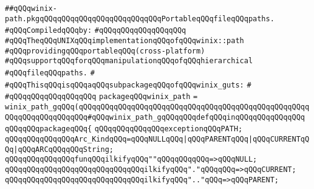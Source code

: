 \label{src/lib/std/src/posix/winix-path.pkg}
\verb|##qQQqwinix-path.pkgqQQqqQQqqQQqqQQqqQQqqQQqqQQqPortableqQQqfileqQQqpaths.|\newline
\newline
\verb|#qQQqCompiledqQQqby:|\newline
\verb|#qQQqqQQqqQQqqQQqqQQq|\newline
\newline
\verb|#qQQqTheqQQqUNIXqQQqimplementationqQQqofqQQqwinix::path|\newline
\verb|#qQQqprovidingqQQqportableqQQq(cross-platform)|\newline
\verb|#qQQqsupportqQQqforqQQqmanipulationqQQqofqQQqhierarchical|\newline
\verb|#qQQqfileqQQqpaths.|\newline
\verb|#|\newline
\verb|#qQQqThisqQQqisqQQqaqQQqsubpackageqQQqofqQQqwinix_guts:|\newline
\verb|#|\newline
\verb|#qQQqqQQqqQQqqQQqqQQq|\newline
\newline
\newline
\verb|packageqQQqwinix_path|\newline
\verb|=|\newline
\verb|winix_path_gqQQq(qQQqqQQqqQQqqQQqqQQqqQQqqQQqqQQqqQQqqQQqqQQqqQQqqQQqqQQqqQQqqQQqqQQqqQQq#qQQqwinix_path_gqQQqqQQqdefqQQqinqQQqqQQqqQQqqQQq|\newline
\verb|qQQqqQQqpackageqQQq{|\newline
\newline
\verb|qQQqqQQqqQQqqQQqexceptionqQQqPATH;|\newline
\newline
\verb|qQQqqQQqqQQqqQQqArc_KindqQQq=qQQqNULLqQQq|\verb#|qQQqPARENTqQQq|qQQqCURRENTqQQq|qQQqARCqQQqqQQqString;#\newline
\newline
\verb|qQQqqQQqqQQqqQQqfunqQQqilkifyqQQq""qQQqqQQqqQQq=>qQQqNULL;|\newline
\verb|qQQqqQQqqQQqqQQqqQQqqQQqqQQqqQQqilkifyqQQq"."qQQqqQQq=>qQQqCURRENT;|\newline
\verb|qQQqqQQqqQQqqQQqqQQqqQQqqQQqqQQqilkifyqQQq".."qQQq=>qQQqPARENT;|\newline
